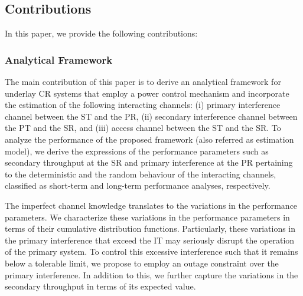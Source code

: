 \subsection{Contributions}
In this paper, we provide the following contributions: 
\subsubsection{Analytical Framework}
The main contribution of this paper is to derive an analytical framework for underlay CR systems that employ a power control mechanism and incorporate the estimation of the following interacting channels: (i) primary interference channel between the ST and the PR, (ii) secondary interference channel between the PT and the SR, and (iii) access channel between the ST and the SR. To analyze the performance of the proposed framework (also referred as estimation model), we derive the expressions of the performance parameters such as secondary throughput at the SR and primary interference at the PR pertaining to the deterministic and the random behaviour of the interacting channels, classified as short-term and long-term performance analyses, respectively. 

The imperfect channel knowledge translates to the variations in the performance parameters. We characterize these variations in the performance parameters in terms of their cumulative distribution functions. Particularly, these variations in the primary interference that exceed the IT may seriously disrupt the operation of the primary system. To control this excessive interference such that it remains below a tolerable limit, we propose to employ an outage constraint over the primary interference. In addition to this, we further capture the variations in the secondary throughput in terms of its expected value. %
